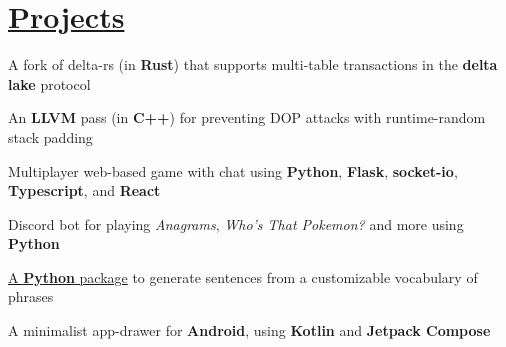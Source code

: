 
\section{\href{https://naveen-u.github.io/projects/}{Projects}}
\resumeItemListStart

{A fork of delta-rs (in \textbf{Rust}) that supports multi-table transactions in the \textbf{delta lake} protocol}

{An \textbf{LLVM} pass (in \textbf{C++}) for preventing DOP attacks with runtime-random stack padding}

{Multiplayer web-based game with chat using \textbf{Python}, \textbf{Flask}, \textbf{socket-io}, \textbf{Typescript}, and \textbf{React}}

{Discord bot for playing \textit{Anagrams}, \textit{Who's That Pokemon?} and more using \textbf{Python}}

{\href{https://pypi.org/project/nabg/}{A \textbf{Python} package} to generate sentences from a customizable vocabulary of phrases}


{A minimalist app-drawer for \textbf{Android}, using \textbf{Kotlin} and \textbf{Jetpack Compose}}

\resumeItemListEnd